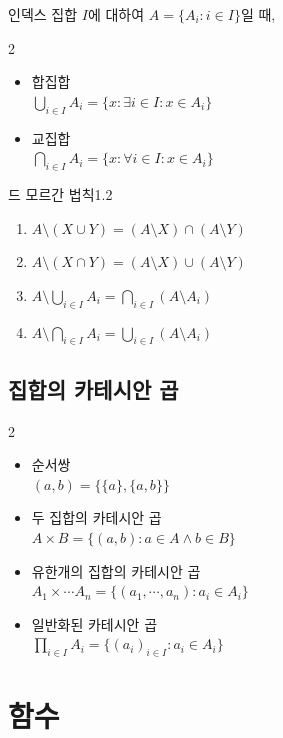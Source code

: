 \documentclass{article}
\begin{document}
\noindent 인덱스 집합 $I$에 대하여 $A=\{A_i:i\in I\}$일 때,
\begin{multicols}{2}
    \begin{itemize}
        \item 합집합 \\
            $\bigcup_{i\in I}A_i=\{x:\exists i\in I:x\in A_i\}$
        \item 교집합 \\
            $\bigcap_{i\in I}A_i=\{x:\forall i\in I:x\in A_i\}$
    \end{itemize}
\end{multicols}

\begin{thm}{드 모르간 법칙}{1.2}
    \begin{enumerate}[(1)]
        \item $A\setminus(X\cup Y)=(A\setminus X)\cap(A\setminus Y)$
        \item $A\setminus(X\cap Y)=(A\setminus X)\cup(A\setminus Y)$
        \item $A\setminus\bigcup_{i\in I}A_i=\bigcap_{i\in I}(A\setminus A_i)$
        \item $A\setminus\bigcap_{i\in I}A_i=\bigcup_{i\in I}(A\setminus A_i)$
    \end{enumerate}
\end{thm}

\subsection{집합의 카테시안 곱}
\begin{multicols}{2}
    \begin{itemize}
        \item 순서쌍 \\
            $(a,b)=\{\{a\},\{a,b\}\}$
        \item 두 집합의 카테시안 곱 \\
            $A\times B=\{(a,b):a\in A\wedge b\in B\}$
        \item 유한개의 집합의 카테시안 곱 \\
            $A_1\times\cdots A_n=\{(a_1,\cdots,a_n):a_i\in A_i\}$
        \item 일반화된 카테시안 곱 \\
            $\prod_{i\in I}A_i=\{(a_i)_{i\in I}:a_i\in A_i\}$
    \end{itemize}
\end{multicols}

\section{함수}
\end{document}
